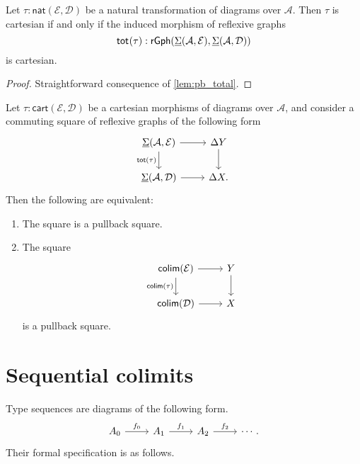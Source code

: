 \begin{prp}\label{prp:nattrans_cartesian}
Let $\tau:\mathsf{nat}(\mathcal{E},\mathcal{D})$ be a natural transformation of diagrams over $\mathcal{A}$. Then $\tau$ is cartesian if and only if the induced morphism of reflexive graphs
\begin{equation*}
\mathsf{tot}_{}(\tau) : \mathsf{rGph}(\underline{\Sigma}(\mathcal{A},\mathcal{E}),\underline{\Sigma}(\mathcal{A},\mathcal{D}))
\end{equation*}
is cartesian.
\end{prp}

\begin{proof}
Straightforward consequence of \cref{lem:pb_total}.
\end{proof}

\begin{cor}
Let $\tau:\mathsf{cart}(\mathcal{E},\mathcal{D})$ be a cartesian morphisms of diagrams over $\mathcal{A}$, and consider a commuting square of reflexive graphs of the following form
\begin{equation*}
\begin{tikzcd}
\msm{\mathcal{A}}{\mathcal{E}} \arrow[d,swap,"\mathsf{tot}(\tau)"] \arrow[r] & \Delta Y \arrow[d] \\
\msm{\mathcal{A}}{\mathcal{D}} \arrow[r] & \Delta X.
\end{tikzcd}
\end{equation*}
Then the following are equivalent:
\begin{enumerate}
\item The square is a pullback square.
\item The square
\begin{equation*}
\begin{tikzcd}
\mathsf{colim}(\mathcal{E}) \arrow[r] \arrow[d,swap,"\mathsf{colim}(\tau)"] & Y \arrow[d] \\
\mathsf{colim}(\mathcal{D}) \arrow[r] & X
\end{tikzcd}
\end{equation*}
is a pullback square.
\end{enumerate}
\end{cor}

\section{Sequential colimits}

Type sequences are diagrams of the following form.
\begin{equation*}
\begin{tikzcd}
A_0 \arrow[r,"f_0"] & A_1 \arrow[r,"f_1"] & A_2 \arrow[r,"f_2"] & \cdots.
\end{tikzcd}
\end{equation*}
Their formal specification is as follows.

